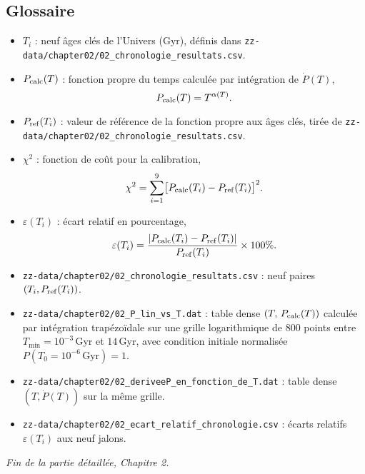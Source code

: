 \subsection{Glossaire}
\begin{itemize}
  \item $T_i$ : neuf âges clés de l’Univers (Gyr), définis dans \texttt{zz-data/chapter02/02\_chronologie\_resultats.csv}.
  \item $P_{\rm calc}(T)$ : fonction propre du temps calculée par intégration de $\dot P(T)$,
    \[
      P_{\rm calc}(T)=T^{\alpha(T)}.
    \]
  \item $P_{\rm ref}(T_i)$ : valeur de référence de la fonction propre aux âges clés, tirée de \texttt{zz-data/chapter02/02\_chronologie\_resultats.csv}.
  \item $\chi^2$ : fonction de coût pour la calibration,
    \[
      \chi^2 = \sum_{i=1}^{9}\bigl[P_{\rm calc}(T_i)-P_{\rm ref}(T_i)\bigr]^{2}.
    \]
  \item $\varepsilon(T_i)$ : écart relatif en pourcentage,
    \[
      \varepsilon(T_i)
      = \frac{\lvert P_{\rm calc}(T_i)-P_{\rm ref}(T_i)\rvert}
             {P_{\rm ref}(T_i)}\times100\%.
    \]
  \item \texttt{zz-data/chapter02/02\_chronologie\_resultats.csv} : neuf paires $(T_i,P_{\rm ref}(T_i))$.
  \item \texttt{zz-data/chapter02/02\_P\_lin\_vs\_T.dat} : table dense \((T,\,P_{\rm calc}(T))\) calculée par intégration trapézoïdale sur une grille logarithmique de 800 points entre \(T_{\min}=10^{-3}\)\,Gyr et \(14\)\,Gyr, avec condition initiale normalisée \(P(T_{0}=10^{-6}\,\mathrm{Gyr})=1\).
  \item \texttt{zz-data/chapter02/02\_deriveeP\_en\_fonction\_de_T.dat} : table dense $(T,\dot P(T))$ sur la même grille.
  \item \texttt{zz-data/chapter02/02\_ecart\_relatif\_chronologie.csv} : écarts relatifs $\varepsilon(T_i)$ aux neuf jalons.
\end{itemize}

\bigskip
\noindent\emph{Fin de la partie détaillée, Chapitre 2.}
